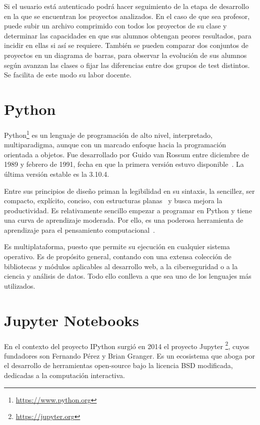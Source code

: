 \documentclass[a4paper, 12pt]{book}
\begin{document}
Si el usuario está autenticado podrá hacer seguimiento de la etapa de desarrollo en la que se encuentran los proyectos analizados. En el caso de que sea profesor, puede subir un archivo comprimido con todos los proyectos de su clase y determinar las capacidades en que sus alumnos obtengan peores resultados, para incidir en ellas si así se requiere. También se pueden comparar dos conjuntos de proyectos en un diagrama de barras, para observar la evolución de sus alumnos según avanzan las clases o fijar las diferencias entre dos grupos de test distintos. Se facilita de este modo su labor docente.

\section{Python}
\label{sec:python}
Python\footnote{\url{https://www.python.org}} es un lenguaje de programación de alto nivel, interpretado, multiparadigma, aunque con un marcado enfoque hacia la programación orientada a objetos. Fue desarrollado por Guido van Rossum entre diciembre de 1989 y febrero de 1991, fecha en que la primera versión estuvo disponible~\cite{van2007python}. La última versión estable es la 3.10.4.

Entre sus principios de diseño priman la legibilidad en su sintaxis, la sencillez, ser compacto, explícito, conciso, con estructuras planas~\cite{peters2010zen} y busca mejora la productividad. Es relativamente sencillo empezar a programar en Python y tiene una curva de aprendizaje moderada. Por ello, es una poderosa herramienta de aprendizaje para el pensamiento computacional~\cite{wang2021research}.

Es multiplataforma, puesto que permite su ejecución en cualquier sistema operativo. Es de propósito general, contando con una extensa colección de bibliotecas y módulos aplicables al desarrollo web, a la ciberseguridad o a la ciencia y análisis de datos. Todo ello conlleva a que sea uno de los lenguajes más utilizados. 

\section{Jupyter Notebooks}
\label{sec:jupyter}

En el contexto del proyecto IPython surgió en 2014 el proyecto Jupyter \footnote{\url{https://jupyter.org}}, cuyos fundadores son Fernando Pérez y Brian Granger. Es un ecosistema que aboga por el desarrollo de herramientas open-source bajo la licencia BSD modificada, dedicadas a la computación interactiva. 
\end{document}
